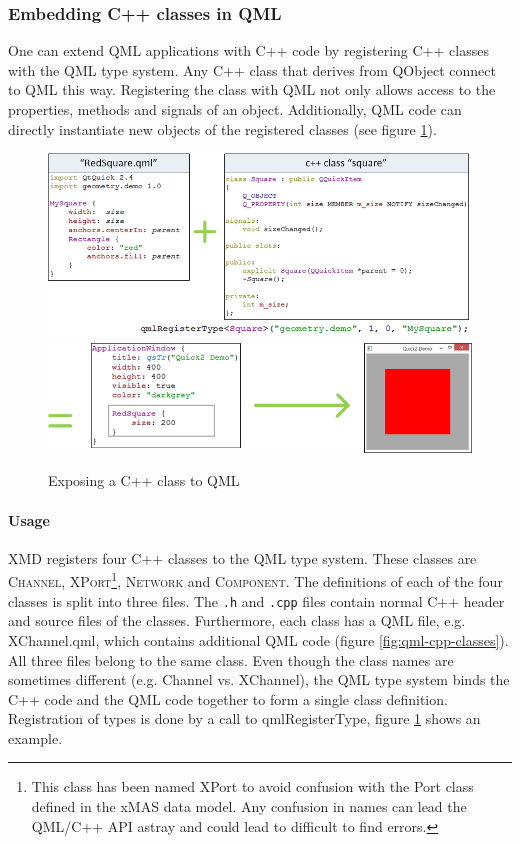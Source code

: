 \subsubsection{Embedding C++ classes in QML}

One can extend QML applications with C++ code by registering C++ classes
with the QML type system. Any C++ class that derives from QObject connect to QML this way.
Registering the class with QML not only allows access to the properties,
methods and signals of an object. Additionally, QML code can directly instantiate
new objects of the registered classes (see figure \ref{fig:register-qml}).

\begin{figure}
    \includegraphics[width=\textwidth]{qml1}
    \includegraphics[width=\textwidth]{qml2}
    \caption{Exposing a C++ class to QML}
    \label{fig:register-qml}
\end{figure}

\paragraph{Usage}XMD registers four C++ classes to the QML type system. These classes
are \textsc{Channel}, \textsc{XPort}\footnote{This class has been named XPort to
avoid confusion with the Port class defined in the xMAS data model. Any confusion
in names can lead the QML/C++ API astray and could lead to difficult to find errors.}, 
\textsc{Network} and \textsc{Component}. 
The definitions of each of the four classes is split into three files. 
The {\tt .h} and {\tt .cpp} files contain normal C++ header and source files of the 
classes. Furthermore, each class has a QML file, e.g. XChannel.qml, which contains
additional QML code (figure \ref{fig:qml-cpp-classes}). All three files belong to
the same class. Even though the class names are sometimes different (e.g. Channel vs.
XChannel), the QML type system binds the C++ code and the QML code together to form a
single class definition. Registration of types is done by a call to qmlRegisterType,
figure \ref{fig:register-qml} shows an example.

